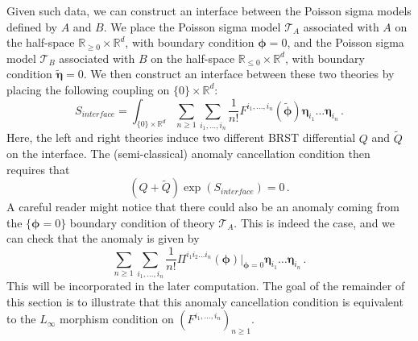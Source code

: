 \documentclass[11pt]{article}
\newcommand{\R}{\mathbb{R}}
\numberwithin{equation}{section}
\begin{document}
Given such data, we can construct an interface between the Poisson sigma models defined by $A$ and $B$. We place the Poisson sigma model $\mathcal{T}_A$ associated with $A$ on the half-space $\R_{\geq 0}\times \R^d$, with boundary condition $\boldsymbol{\phi}=0$, and the Poisson sigma model $\mathcal{T}_B$ associated with $B$ on the half-space $\R_{\leq 0}\times \R^d$, with boundary condition $\widetilde{\boldsymbol{\eta}}=0$. We then construct an interface between these two theories by placing the following coupling on $\{0\}\times \R^d$:
\begin{equation}\label{eq:int_action}
	S_{interface} = \int_{\{0\}\times \R^{d}} \sum_{n\geq 1}\sum_{i_1,\dots,i_n}\frac{1}{n!}F^{i_1,\dots,i_n}(\widetilde{\boldsymbol{\phi}})\boldsymbol{\eta}_{i_1}\dots \boldsymbol{\eta}_{i_n} \,.	
\end{equation}
Here, the left and right theories induce two different BRST differential $Q$ and $\widetilde{Q}$ on the interface. The (semi-classical) anomaly cancellation condition then requires that
\begin{equation}\label{eq:int_anomaly_free}
	(Q + \widetilde{Q})\exp(S_{interface}) = 0\,.
\end{equation}
A careful reader might notice that there could also be an anomaly coming from the $\{\boldsymbol{\phi} = 0\}$ boundary condition of theory $\mathcal{T}_A$. This is indeed the case, and we can check that the anomaly is given by
\begin{equation}\label{eq:bdy_ano_A}
	\sum_{n \geq 1}\sum_{i_1,\dots, i_n}\frac{1}{n!}\Pi^{i_1i_2\dots i_n}(\boldsymbol{\phi})|_{\boldsymbol{\phi}=0}\boldsymbol{\eta}_{i_1}\dots\boldsymbol{\eta}_{i_n}\,.
\end{equation}
This will be incorporated in the later computation. The goal of the remainder of this section is to illustrate that this anomaly cancellation condition is equivalent to the $L_\infty$ morphism condition on $(F^{i_1,\dots,i_n})_{n\geq 1}$.
\end{document}
